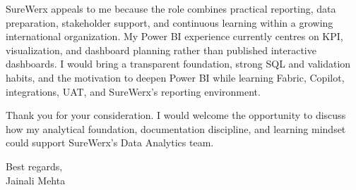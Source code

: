 \documentclass[letterpaper,11pt]{article}
\begin{document}
\bigbreak
SureWerx appeals to me because the role combines practical reporting, data preparation, stakeholder support, and continuous learning within a growing international organization. My Power BI experience currently centres on KPI, visualization, and dashboard planning rather than published interactive dashboards. I would bring a transparent foundation, strong SQL and validation habits, and the motivation to deepen Power BI while learning Fabric, Copilot, integrations, UAT, and SureWerx's reporting environment.

\bigbreak
Thank you for your consideration. I would welcome the opportunity to discuss how my analytical foundation, documentation discipline, and learning mindset could support SureWerx's Data Analytics team.

\bigbreak
Best regards,\\
Jainali Mehta
\end{document}
